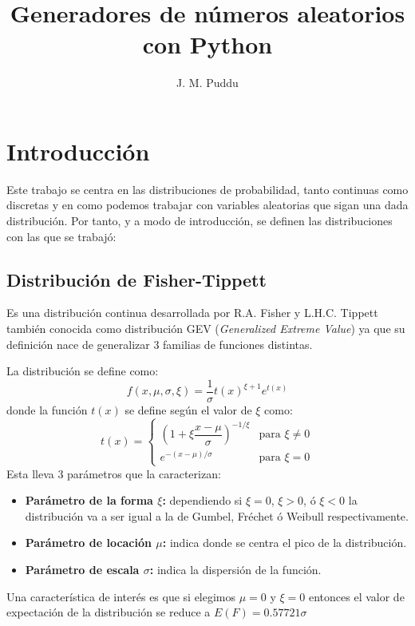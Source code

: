 \documentclass[baaa]{baaa}
\title{Generadores de números aleatorios con Python}
\author{J. M. Puddu \inst{1}}
\institute{
Facultad de Matemática, Astronomía, Física y Computación, UNC, Argentina
}
\begin{document}
\maketitle

\section{Introducción}
Este trabajo se centra en las distribuciones de probabilidad, tanto continuas como discretas y en como podemos trabajar con variables aleatorias que sigan una dada distribución. Por tanto, y a modo de introducción, se definen las distribuciones con las que se trabajó:

\subsection{Distribución de Fisher-Tippett}
 
Es una distribución continua desarrollada por R.A. Fisher y L.H.C. Tippett  también conocida como distribución GEV (\textit{Generalized Extreme Value}) ya que su definición nace de generalizar 3 familias de funciones distintas. 


La distribución se define como:
\begin{equation}
    f(x,\mu,\sigma,\xi)= \frac{1}{\sigma}t(x)^{\xi+1}e^{t(x)}
\end{equation}
donde la función $t(x)$ se define según el valor de $\xi$ como:
\begin{equation}
 t(x) = 
 \begin{cases}
 \left(1+\xi\dfrac{x-\mu}{\sigma}\right)^{-1/\xi} & \text{para } \xi \neq 0 \\[8pt]
 e^{-(x-\mu)/\sigma} & \text{para } \xi = 0
 \end{cases}
\end{equation} 
Esta lleva 3 parámetros que la caracterizan:
\begin{itemize}
    \item \textbf{Parámetro de la forma $\xi$: }dependiendo si $\xi=0$, $\xi>0$, ó $\xi<0$ la distribución va a ser igual a la de  Gumbel, Fréchet ó Weibull respectivamente. 
    \item \textbf{Parámetro de locación $\mu$: }indica donde se centra el pico de la distribución.
    \item \textbf{Parámetro de escala $\sigma$: }indica la dispersión de la función.
\end{itemize}
Una característica de interés es que si elegimos $\mu=0$ y $\xi=0$ entonces el valor de expectación de la distribución se reduce a $E(F)=0.57721\sigma$
\end{document}
